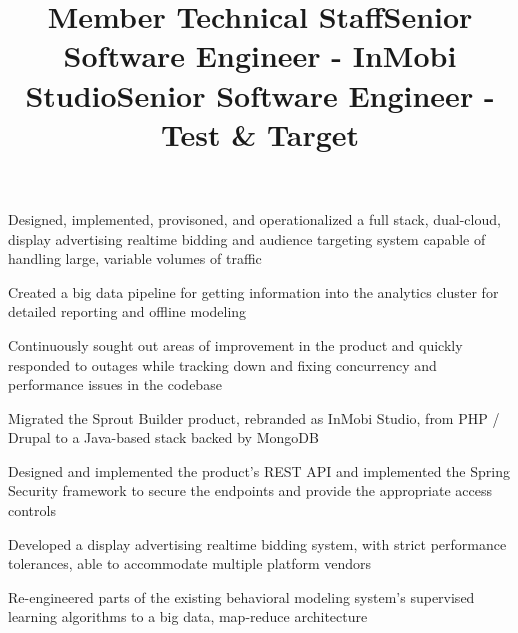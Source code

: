 \documentclass[margin,line]{resume}
\newenvironment{bullet-list}{
  \begin{list}{$\bullet$}{%
      \setlength{\itemsep}{0in}
      \setlength{\parsep}{0in} \setlength{\parskip}{0in}
      \setlength{\topsep}{0in} \setlength{\partopsep}{0in}
      \setlength{\leftmargin}{0.2in}}}{\end{list}}
\begin{document}
\begin{resume}
\title{Member Technical Staff}
\begin{position}
\vspace{-.3cm}
\begin{bullet-list}
\item Designed, implemented, provisoned, and operationalized a full
stack, dual-cloud, display advertising realtime bidding and audience
targeting system capable of handling large, variable volumes of traffic
\item Created a big data pipeline for getting information
into the analytics cluster for detailed reporting and offline modeling
\item Continuously sought out areas of improvement in the product and
quickly responded to outages while tracking down and fixing concurrency
and performance issues in the codebase
\end{bullet-list}
\end{position}

\title{Senior Software Engineer - InMobi Studio}
\begin{position}
\vspace{-.3cm}
\begin{bullet-list}
\item Migrated the Sprout Builder product, rebranded as InMobi Studio,
from PHP / Drupal to a Java-based stack backed by MongoDB
\item Designed and implemented the product's REST API and implemented
the Spring Security framework to secure the endpoints and provide
the appropriate access controls
\end{bullet-list}
\end{position}

\title{Senior Software Engineer - Test \& Target}
\begin{position}
\vspace{-.3cm}
\begin{bullet-list}
\item Developed a display advertising realtime bidding system, with strict
performance tolerances, able to accommodate multiple platform vendors
\item Re-engineered parts of the existing behavioral modeling system's supervised
learning algorithms to a big data, map-reduce architecture
\end{bullet-list}
\end{position}


\end{resume}
\end{document}
